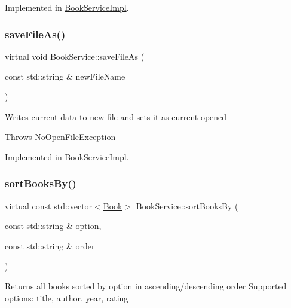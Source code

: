 Implemented in \hyperlink{classBookServiceImpl_af6b0c5e77b20b1baf2e7be7630fb56b8}{Book\+Service\+Impl}.

\mbox{\label{classBookService_aa98047f82d65f0514b1e7add838ecbe7}} 
\subsubsection{\texorpdfstring{save\+File\+As()}{saveFileAs()}}
{\footnotesize\ttfamily virtual void Book\+Service\+::save\+File\+As (\begin{DoxyParamCaption}\item[{const std\+::string \&}]{new\+File\+Name }\end{DoxyParamCaption})\hspace{0.3cm}{\ttfamily [pure virtual]}}

Writes current data to new file and sets it as current opened

Throws \hyperlink{structNoOpenFileException}{No\+Open\+File\+Exception} 

Implemented in \hyperlink{classBookServiceImpl_a8d7fa1e7a5f64a7716422bd18e79c35f}{Book\+Service\+Impl}.

\mbox{\label{classBookService_a6336a7b95ae7a0d0e77782607d2a0dc3}} 
\subsubsection{\texorpdfstring{sort\+Books\+By()}{sortBooksBy()}\hspace{0.1cm}{\footnotesize\ttfamily [1/2]}}
{\footnotesize\ttfamily virtual const std\+::vector$<$\hyperlink{classBook}{Book}$>$ Book\+Service\+::sort\+Books\+By (\begin{DoxyParamCaption}\item[{const std\+::string \&}]{option,  }\item[{const std\+::string \&}]{order }\end{DoxyParamCaption})\hspace{0.3cm}{\ttfamily [pure virtual]}}

Returns all books sorted by option in ascending/descending order Supported options\+: title, author, year, rating

